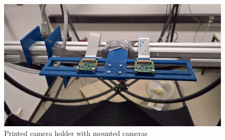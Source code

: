 \begin{figure}[H]
\includegraphics[width=\textwidth]{images/real_camera_setup.jpg}
\caption{Printed camera holder with mounted cameras}
\label{img:camera_real} 
\end{figure}

